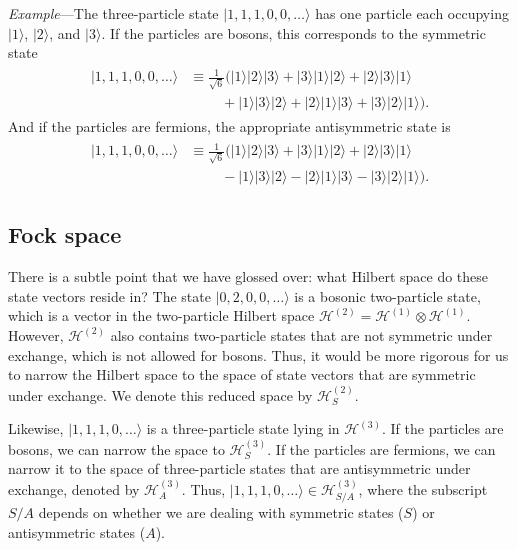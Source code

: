 \documentclass[pra,12pt]{revtex4-2}
\begin{document}
\begin{framed}
\noindent
\textit{Example}---The three-particle state $|1,1,1,0,0,\dots\rangle$
has one particle each occupying $|1\rangle$, $|2\rangle$, and
$|3\rangle$.  If the particles are bosons, this corresponds to the
symmetric state
\begin{align}
  \begin{aligned}|1,1,1,0,0,\dots\rangle &\equiv \frac{1}{\sqrt{6}}\Big(|1\rangle|2\rangle|3\rangle + |3\rangle|1\rangle|2\rangle + |2\rangle|3\rangle|1\rangle \\&\;\qquad+ |1\rangle|3\rangle|2\rangle + |2\rangle|1\rangle|3\rangle + |3\rangle|2\rangle|1\rangle \Big).
  \end{aligned}
\end{align}
And if the particles are fermions, the appropriate antisymmetric state
is
\begin{align}
  \begin{aligned}|1,1,1,0,0,\dots\rangle &\equiv \frac{1}{\sqrt{6}} \Big(|1\rangle|2\rangle|3\rangle + |3\rangle|1\rangle|2\rangle + |2\rangle|3\rangle|1\rangle \\&\;\qquad - |1\rangle|3\rangle|2\rangle - |2\rangle|1\rangle|3\rangle - |3\rangle|2\rangle|1\rangle\Big).
  \end{aligned}
\end{align}
\end{framed}

\subsection{Fock space}

There is a subtle point that we have glossed over: what Hilbert space
do these state vectors reside in?  The state $|0,2,0,0,\dots\rangle$
is a bosonic two-particle state, which is a vector in the two-particle
Hilbert space $\mathscr{H}^{(2)} = \mathscr{H}^{(1)}\otimes
\mathscr{H}^{(1)}$.  However, $\mathscr{H}^{(2)}$ also contains
two-particle states that are not symmetric under exchange, which is
not allowed for bosons.  Thus, it would be more rigorous for us to
narrow the Hilbert space to the space of state vectors that are
symmetric under exchange.  We denote this reduced space by
$\mathscr{H}^{(2)}_S$.

Likewise, $|1,1,1,0,\dots\rangle$ is a three-particle state lying in
$\mathscr{H}^{(3)}$.  If the particles are bosons, we can narrow the
space to $\mathscr{H}^{(3)}_S$.  If the particles are fermions, we can
narrow it to the space of three-particle states that are antisymmetric
under exchange, denoted by $\mathscr{H}^{(3)}_A$.  Thus,
$|1,1,1,0,\dots\rangle \in \mathscr{H}^{(3)}_{S/A}$, where the
subscript $S/A$ depends on whether we are dealing with symmetric
states ($S$) or antisymmetric states ($A$).
\end{document}
